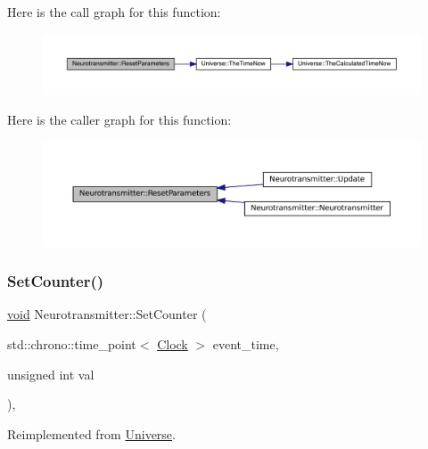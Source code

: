 Here is the call graph for this function\+:\nopagebreak
\begin{figure}[H]
\begin{center}
\leavevmode
\includegraphics[width=350pt]{class_neurotransmitter_a6e7650d738bccfbbd49ede10970687aa_cgraph}
\end{center}
\end{figure}
Here is the caller graph for this function\+:\nopagebreak
\begin{figure}[H]
\begin{center}
\leavevmode
\includegraphics[width=350pt]{class_neurotransmitter_a6e7650d738bccfbbd49ede10970687aa_icgraph}
\end{center}
\end{figure}
\mbox{\label{class_neurotransmitter_ae16ec051609867d4f64fad5ba4449443}} 
\subsubsection{\texorpdfstring{Set\+Counter()}{SetCounter()}}
{\footnotesize\ttfamily \mbox{\hyperlink{glad_8h_a950fc91edb4504f62f1c577bf4727c29}{void}} Neurotransmitter\+::\+Set\+Counter (\begin{DoxyParamCaption}\item[{std\+::chrono\+::time\+\_\+point$<$ \mbox{\hyperlink{universe_8h_a0ef8d951d1ca5ab3cfaf7ab4c7a6fd80}{Clock}} $>$}]{event\+\_\+time,  }\item[{unsigned int}]{val }\end{DoxyParamCaption})\hspace{0.3cm}{\ttfamily [inline]}, {\ttfamily [virtual]}}



Reimplemented from \mbox{\hyperlink{class_universe_aa22202ae740eb1355529afcb13285e91}{Universe}}.



